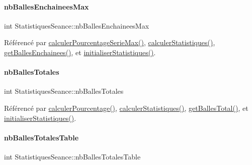 \paragraph{\texorpdfstring{nb\+Balles\+Enchainees\+Max}{nbBallesEnchaineesMax}}
{\footnotesize\ttfamily int Statistiques\+Seance\+::nb\+Balles\+Enchainees\+Max\hspace{0.3cm}{\ttfamily [private]}}



Référencé par \hyperlink{class_statistiques_seance_ad042b683ce7b4db507a443b1b27bfef8}{calculer\+Pourcentage\+Serie\+Max()}, \hyperlink{class_statistiques_seance_a8bf60224113e3697adfe0a4f8f22ab7b}{calculer\+Statistiques()}, \hyperlink{class_statistiques_seance_a1f241d7ef584ebffa2246134c63be53b}{get\+Balles\+Enchainees()}, et \hyperlink{class_statistiques_seance_a17e1c49e2986a8490ff96e4bd7733291}{initialiser\+Statistiques()}.

\mbox{\label{class_statistiques_seance_a27eb3965bbe304700d3254534c5e4ed3}} 
\paragraph{\texorpdfstring{nb\+Balles\+Totales}{nbBallesTotales}}
{\footnotesize\ttfamily int Statistiques\+Seance\+::nb\+Balles\+Totales\hspace{0.3cm}{\ttfamily [private]}}



Référencé par \hyperlink{class_statistiques_seance_a67759edd6c296bd6b66f7860dbac130e}{calculer\+Pourcentage()}, \hyperlink{class_statistiques_seance_a8bf60224113e3697adfe0a4f8f22ab7b}{calculer\+Statistiques()}, \hyperlink{class_statistiques_seance_aaefd0b775012ec914a36a262dc14fc66}{get\+Balles\+Total()}, et \hyperlink{class_statistiques_seance_a17e1c49e2986a8490ff96e4bd7733291}{initialiser\+Statistiques()}.

\mbox{\label{class_statistiques_seance_aa152a6f154cc832c3355342ecf94162a}} 
\paragraph{\texorpdfstring{nb\+Balles\+Totales\+Table}{nbBallesTotalesTable}}
{\footnotesize\ttfamily int Statistiques\+Seance\+::nb\+Balles\+Totales\+Table\hspace{0.3cm}{\ttfamily [private]}}



